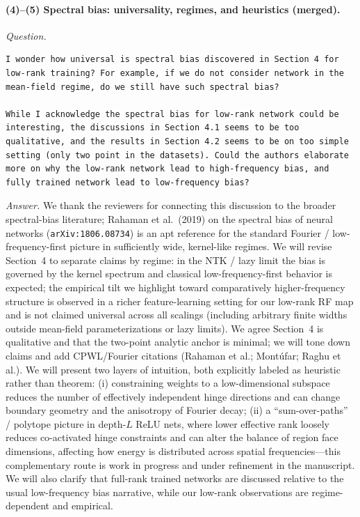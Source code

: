 \documentclass[11pt,a4paper]{article}
\begin{document}
\paragraph{(4)--(5) Spectral bias: universality, regimes, and heuristics (merged).}
\textit{Question.}\par
\begin{verbatim}
I wonder how universal is spectral bias discovered in Section 4 for low-rank training? For example, if we do not consider network in the mean-field regime, do we still have such spectral bias?

While I acknowledge the spectral bias for low-rank network could be interesting, the discussions in Section 4.1 seems to be too qualitative, and the results in Section 4.2 seems to be on too simple setting (only two point in the datasets). Could the authors elaborate more on why the low-rank network lead to high-frequency bias, and fully trained network lead to low-frequency bias?
\end{verbatim}
\textit{Answer.} We thank the reviewers for connecting this discussion to the broader spectral-bias literature; Rahaman et al.\ (2019) on the spectral bias of neural networks (\texttt{arXiv:1806.08734}) is an apt reference for the standard Fourier / low-frequency-first picture in sufficiently wide, kernel-like regimes. We will revise Section~4 to separate claims by regime: in the NTK / lazy limit the bias is governed by the kernel spectrum and classical low-frequency-first behavior is expected; the empirical tilt we highlight toward comparatively higher-frequency structure is observed in a richer feature-learning setting for our low-rank RF map and is not claimed universal across all scalings (including arbitrary finite widths outside mean-field parameterizations or lazy limits). We agree Section~4 is qualitative and that the two-point analytic anchor is minimal; we will tone down claims and add CPWL/Fourier citations (Rahaman et al.; Mont\'ufar; Raghu et al.). We will present two layers of intuition, both explicitly labeled as heuristic rather than theorem: (i) constraining weights to a low-dimensional subspace reduces the number of effectively independent hinge directions and can change boundary geometry and the anisotropy of Fourier decay; (ii) a ``sum-over-paths'' / polytope picture in depth-$L$ ReLU nets, where lower effective rank loosely reduces co-activated hinge constraints and can alter the balance of region face dimensions, affecting how energy is distributed across spatial frequencies---this complementary route is work in progress and under refinement in the manuscript. We will also clarify that full-rank trained networks are discussed relative to the usual low-frequency bias narrative, while our low-rank observations are regime-dependent and empirical.
\end{document}
